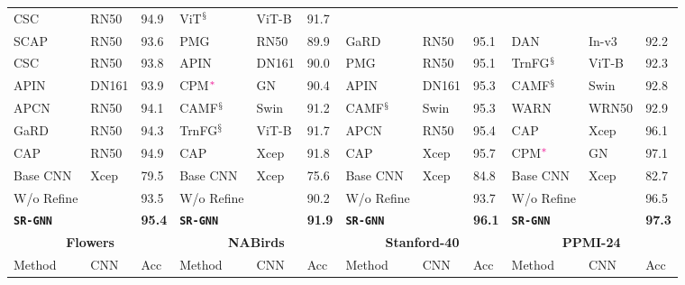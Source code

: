 \documentclass[journal]{IEEEtran}
\begin{document}
\begin{table*}[t]
\begin{small}
\begin{tabular}{|p{1.7 cm} p{8 mm} p{5 mm}|p{1.7 cm} p{8 mm} p{5 mm}|p{1.8 cm} p{8 mm} p{5 mm}|p{1.9 cm} p{13 mm} p{5 mm}|}
CSC \cite{wang2020category} & RN50& 94.9 &  
ViT{\color{orange}$^\mathsection$} \cite{dosovitskiy2020image} & ViT-B &	91.7 \\ 
SCAP \cite{liu2021learning} & RN50 & 93.6 &  
PMG \cite {chang2021your} & RN50 & 89.9 & 
GaRD\cite{zhao2021graph} & RN50 & 95.1 &
DAN \cite {hu2019see} & In-v3 &92.2    \\
CSC\cite{wang2020category} & RN50 & 93.8 & 
APIN \cite{zhuang2020learning} &DN161 & 90.0  & PMG \cite{chang2021your} &RN50 & 95.1  & 
TrnFG{\color{orange}$^\mathsection$}\cite{he2021transfg} & ViT-B &92.3 \\ 
APIN \cite{zhuang2020learning}  &DN161 & 93.9  &
CPM$^{\color{magenta}*}$ \cite{ge2019weakly} & GN  & 90.4 & 
APIN\cite{zhuang2020learning} & DN161 & 95.3 & 
CAMF{\color{orange}$^\mathsection$} \cite{miao2021complemental} & Swin & 92.8  \\ 
APCN \cite{ding2021ap} & RN50 & 94.1  & CAMF{\color{orange}$^\mathsection$} \cite{miao2021complemental} & Swin &  91.2  & CAMF{\color{orange}$^\mathsection$} \cite{miao2021complemental} & Swin & 95.3 & WARN \cite{lopez2020pay} & WRN50 &92.9   \\
GaRD\cite{zhao2021graph} & RN50 & 94.3 & TrnFG{\color{orange}$^\mathsection$}\cite{he2021transfg} & ViT-B & 91.7 & APCN \cite{ding2021ap}  &RN50 & 95.4   & 
CAP \cite{behera2021context} & Xcep & 96.1 \\
 CAP \cite{behera2021context} & RN50 & 94.9 & CAP \cite{behera2021context} & Xcep & 91.8  &  CAP \cite{behera2021context} & Xcep & 95.7  &  CPM$^{\color{magenta}*}$ \cite{ge2019weakly} & GN & 97.1  \\
    \hline
    Base CNN & Xcep & 79.5   & Base CNN & Xcep &75.6  & Base CNN & Xcep &84.8 & Base CNN  & Xcep  & 82.7  \\
    W/o Refine &  & 93.5   &W/o Refine &   &90.2 &W/o Refine & &93.7  &W/o Refine &  &96.5 \\
    \textbf{\texttt{SR-GNN}} &  & \textbf{95.4} &\textbf{\texttt{SR-GNN}} &  & \textbf{91.9} &\textbf{\texttt{SR-GNN}} &  & \textbf{96.1} & \textbf{\texttt{SR-GNN}} &  & \textbf{97.3}   \\
    \hline
    \hline
 \multicolumn{3}{|c|}{\textbf{Flowers}} &
  \multicolumn{3}{|c|}{\textbf{NABirds} \cite{van2015building}} & \multicolumn{3}{|c|}{\textbf{Stanford-40} \cite{yao2011human}} & \multicolumn{3}{|c|}{\textbf{PPMI-24} \cite{yao2010grouplet}}\\
     {Method} & {CNN} &  {Acc} &  {Method} & {CNN} & {Acc} & {Method} & {CNN} & {Acc} & {Method} & {CNN} & {Acc} \\ 

\end{tabular}
\end{small}
\end{table*}
\end{document}
